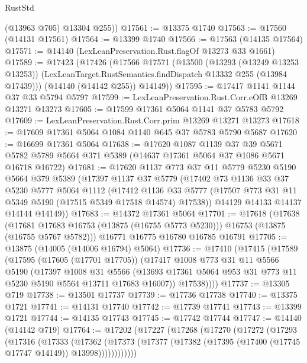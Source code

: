 \begin{lexlean}{RustStd}
\begin{coremodule}
        (@13963 @705)
        @13304
        @255))
@17561 := @13375 @1740
@17563 := @17560 (@14131 @17561)
@17564 := @13399 @1740
@17566 := @17563 (@14135 @17564)
@17571 := @14140 (LexLeanPreservation.Rust.flagOf @13273 @33 @1661)
@17589 := @17423
    (@17426
      (@17566
        @17571
        (@13500
          (@13293 (@13249 @13253 @13253))
          (LexLeanTarget.RustSemantics.findDispatch @13332 @255 (@13984 @17439)))
        (@14140 (@14142 @255))
        @14149))
@17595 := @17417 @1141 @1144 @37 @33 @5794 @5797
@17599 := LexLeanPreservation.Rust.Corr.eOfB @13269 @13271 @13273
@17605 := @17599 @17361 @5064 @1141 @37 @5783 @5792
@17609 := LexLeanPreservation.Rust.Corr.prim @13269 @13271 @13273
@17618 := @17609 @17361 @5064 @1084 @1140 @645 @37 @5783 @5790 @5687
@17620 := @16699 @17361 @5064
@17638 := @17620
    @1087
    @1139
    @37
    @39
    @5671
    @5782
    @5789
    @5664
    @371
    @5389
    (@14637 @17361 @5064 @37 @1086 @5671 @16718 @16722)
@17681 := @17620
    @1137
    @773
    @37
    @11
    @5779
    @5230
    @5190
    @5664
    @379
    @5389
    (@17397
      @1137
      @37
      @5779
      (@17402
        @73
        @1136
        @33
        @37
        @5230
        @5777
        @5064
        @1112
        (@17412
          @1136
          @33
          @5777
          (@17507 @773 @31 @11 @5349 @5190 (@17515 @5349 @17518 @14574) @17538))
        @14129
        @14133
        @14137
        @14144
        @14149))
@17683 := @14372 @17361 @5064
@17701 := @17618
    (@17638
      (@17681 @17683 @16753 (@13875 (@16755 @5773 @5230)))
      @16753
      (@13875 (@16755 @5767 @5782)))
    @16771
    @16775
    @16780
    @16785
    @16791
@17705 := @13875 (@14005 (@14006 @16794) @5064)
@17736 := @17410
    (@17415
      (@17589
        (@17595
          (@17605 (@17701 @17705))
          (@17417
            @1008
            @773
            @31
            @11
            @5566
            @5190
            (@17397
              @1008
              @31
              @5566
              (@13693 @17361 @5064 @953 @31 @773 @11 @5230 @5190 @5564 @13711 @17683 @16007))
            @17538))))
@17737 := @13305 @719
@17738 := @13501 @17737
@17739 := @17736 @17738
@17740 := @13375 @1721
@17741 := @14131 @17740
@17742 := @17739 @17741
@17743 := @13399 @1721
@17744 := @14135 @17743
@17745 := @17742 @17744
@17747 := @14140 (@14142 @719)
@17764 := @17202
    (@17227
      (@17268
        (@17270
          (@17272
            (@17293
              (@17316
                (@17333
                  (@17362
                    (@17373
                      (@17377 (@17382 (@17395 (@17400 (@17745 @17747 @14149)) @13998))))))))))))

\end{coremodule}
\end{lexlean}
